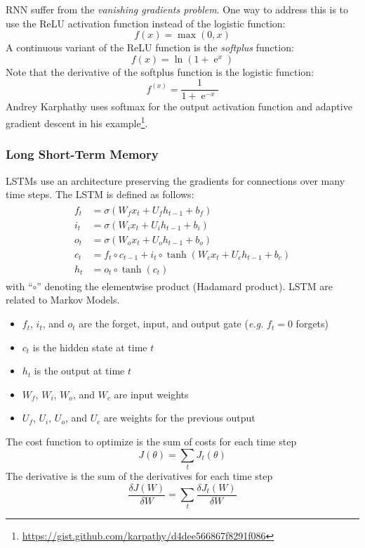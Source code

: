 \documentclass[a4paper,twoside,10pt]{article}
\begin{document}
\ac{RNN} suffer from the \emph{vanishing gradients problem}\citep{elman_finding_1990}.
One way to address this is to use the \ac{ReLU} activation function instead of the logistic function\citep{suresh}:
\begin{equation*}
  f(x)=\operatorname{max}(0,x)
\end{equation*}
A continuous variant of the \ac{ReLU} function is the \emph{softplus} function\cite{wiki:relu}:
\begin{equation*}
  f(x)=\operatorname{ln}(1+\operatorname{e}^x)
\end{equation*}
Note that the derivative of the softplus function is the logistic function\cite{wiki:relu}:
\begin{equation*}
  f^(x)=\frac{1}{1+\operatorname{e}^{-x}}
\end{equation*}
Andrey Karphathy uses softmax for the output activation function and adaptive gradient descent in his example\footnote{\url{https://gist.github.com/karpathy/d4dee566867f8291f086}}.

\subsubsection{Long Short-Term Memory}
\acp{LSTM} use an architecture preserving the gradients for connections over many time steps.
The \ac{LSTM} is defined as follows\citep{wiki:lstm}:
\begin{align*}
  \begin{split}
    f_t &= \sigma(W_{f} x_t + U_{f} h_{t-1} + b_f) \\
    i_t &= \sigma(W_{i} x_t + U_{i} h_{t-1} + b_i) \\
    o_t &= \sigma(W_{o} x_t + U_{o} h_{t-1} + b_o) \\
    c_t &= f_t \circ c_{t-1} + i_t \circ \operatorname{tanh}(W_{c} x_t + U_{c} h_{t-1} + b_c) \\
    h_t &= o_t \circ \operatorname{tanh}(c_t)
  \end{split}
\end{align*}
with ``$\circ$'' denoting the elementwise product (Hadamard product).
\ac{LSTM} are related to Markov Models.
\begin{itemize}
  \item $f_t$, $i_t$, and $o_t$ are the forget, input, and output gate (\emph{e.g.} $f_t=0$ forgets)
  \item $c_t$ is the hidden state at time $t$
  \item $h_t$ is the output at time $t$
  \item $W_f$, $W_i$, $W_o$, and $W_c$ are input weights
  \item $U_f$, $U_i$, $U_o$, and $U_c$ are weights for the previous output
\end{itemize}
The cost function to optimize is the sum of costs for each time step
\begin{equation*}
  J(\theta)=\sum_tJ_t(\theta)
\end{equation*}
The derivative is the sum of the derivatives for each time step
\begin{equation*}
  \frac{\delta J(W)}{\delta W}=\sum_t\frac{\delta J_t(W)}{\delta W}
\end{equation*}
\end{document}
